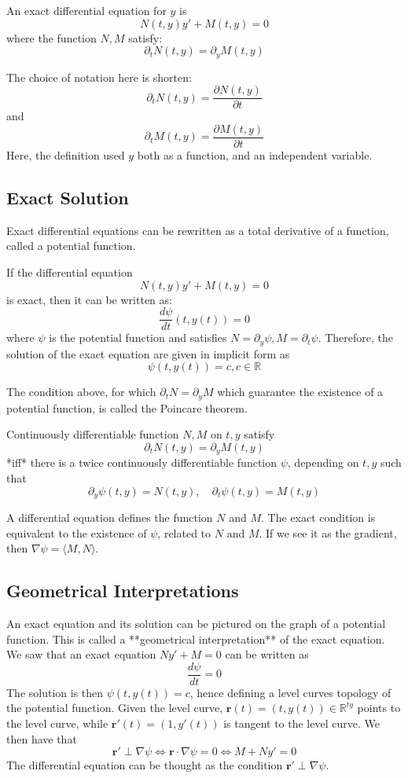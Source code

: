 \begin{definition}
    An exact differential equation for $y$ is $$N(t,y)y'+M(t,y)=0$$
where the function $N,M$ satisfy: $$\partial_{t}N(t,y)=\partial_{y}M(t,y)$$
\end{definition}
The choice of notation here is shorten: $$\partial_{t}N(t,y)=\frac{\partial N(t,y)}{\partial t}$$
and $$\partial_{t}M(t,y)=\frac{\partial M(t,y)}{\partial t}$$
Here, the definition used $y$ both as a function, and an independent variable. 
\subsection{Exact Solution}
Exact differential equations can be rewritten as a total derivative of a function, called a potential function. 
\begin{theorem}
    If the differential equation $$N(t,y)y'+M(t,y)=0$$
is exact, then it can be written as: $$\frac{d\psi}{dt}(t,y(t))=0$$
where $\psi$ is the potential function and satisfies $N=\partial_{y}\psi,M=\partial_{t}\psi$. Therefore, the solution of the exact equation are given in implicit form as $$\psi(t,y(t))=c,c\in\mathbb{R}$$
\end{theorem}

The condition above, for which $\partial_{t}N=\partial_{y}M$  which guarantee the existence of a potential function, is called the Poincare theorem.

\begin{theorem}[Poincare]
    Continuously differentiable function $N,M$ on $t,y$ satisfy $$\partial_{t}N(t,y)=\partial_{y}M(t,y)$$
*iff* there is a twice continuously differentiable function $\psi$, depending on $t,y$ such that $$\partial_{y}\psi(t,y)=N(t,y), \quad \partial_{t}\psi(t,y)=M(t,y)$$
\end{theorem}
A differential equation defines the function $N$ and $M$. The exact condition is equivalent to the existence of $\psi$, related to $N$ and $M$. If we see it as the gradient, then $\nabla \psi=\langle M,N\rangle$. 
\subsection{Geometrical Interpretations}
An exact equation and its solution can be pictured on the graph of a potential function. This is called a **geometrical interpretation** of the exact equation. We saw that an exact equation $Ny'+M=0$ can be written as $$\frac{d\psi}{dt}=0$$
The solution is then $\psi(t,y(t))=c$, hence defining a level curves topology of the potential function. Given the level curve, $\mathbf{r}(t)=(t,y(t))\in \mathbb{R}^{ty}$ points to the level curve, while $\mathbf{r}'(t)=(1,y'(t))$ is tangent to the level curve. We then have that $$\mathbf{r}'\perp \nabla \psi \iff \mathbf{r}\cdot \nabla \psi=0\iff M+Ny'=0$$
The differential equation can be thought as the condition $\mathbf{r}'\perp \nabla \psi$. 


